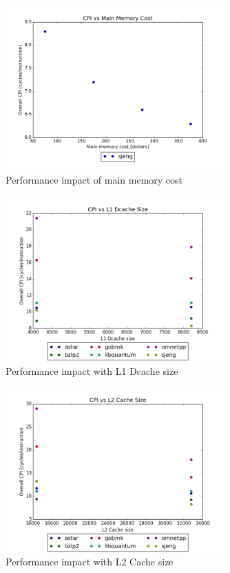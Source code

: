 \documentclass{article}
\begin{document}
\begin{figure}[ht]
    \centering
    \includegraphics[width=0.75\textwidth]{plots/CPI_vs_Main_Mem_Cost.png}
    \caption{Performance impact of main memory cost}
    \label{fig:cpivsmainmemcost}
\end{figure}


\begin{figure}[ht]
    \centering
    \includegraphics[width=0.75\textwidth]{plots/CPI_vs_L1Dcache_size.png}
    \caption{Performance impact with L1 Dcache size}
    \label{fig:cpivsl1size}
\end{figure}

\begin{figure}[ht]
    \centering
    \includegraphics[width=0.75\textwidth]{plots/CPI_vs_L2Cache_size.png}
    \caption{Performance impact with L2 Cache size}
    \label{fig:cpivsl2size}
\end{figure}
\end{document}
